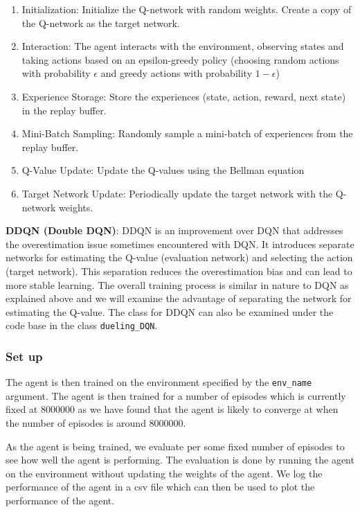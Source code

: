 \documentclass{article}
\newcommand{\code}[1]{\lstinline|#1|}
\begin{document}
\begin{enumerate}
    \item Initialization: Initialize the Q-network with random weights. Create a copy of
          the Q-network as the target network.
    \item Interaction: The agent interacts with the environment, observing states and
          taking actions based on an epsilon-greedy policy (choosing random actions with
          probability $\epsilon$ and greedy actions with probability $1-\epsilon$)
    \item Experience Storage: Store the experiences (state, action, reward, next state)
          in the replay buffer.
    \item Mini-Batch Sampling: Randomly sample a mini-batch of experiences from the
          replay buffer.
    \item Q-Value Update: Update the Q-values using the Bellman equation
    \item Target Network Update: Periodically update the target network with the
          Q-network weights.
\end{enumerate}

\textbf{DDQN (Double DQN)}: DDQN is an improvement over DQN that addresses the
overestimation issue sometimes encountered with DQN. It introduces separate
networks for estimating the Q-value (evaluation network) and selecting the
action (target network). This separation reduces the overestimation bias and
can lead to more stable learning. The overall training process is similar in
nature to DQN as explained above and we will examine the advantage of
separating the network for estimating the Q-value. The class for DDQN can also
be examined under the code base in the class \code{dueling_DQN}.

\subsubsection*{Set up}

The agent is then trained on the environment specified by the \code{env_name}
argument. The agent is then trained for a number of episodes which is currently
fixed at 8000000 as we have found that the agent is likely to converge at when
the number of episodes is around 8000000.

As the agent is being trained, we evaluate per some fixed number of episodes to
see how well the agent is performing. The evaluation is done by running the
agent on the environment without updating the weights of the agent. We log the
performance of the agent in a csv file which can then be used to plot the
performance of the agent.
\end{document}
